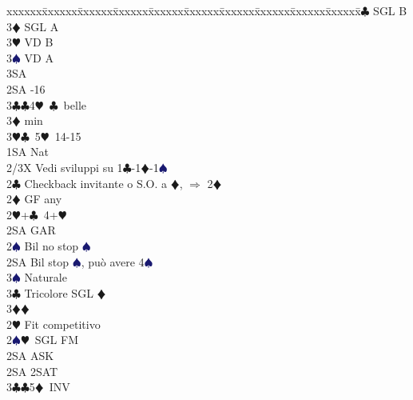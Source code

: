 \documentclass[a4paper,italian]{article}
\newcommand{\BC}{\textcolor{OliveGreen}{$\clubsuit$}}
\newcommand{\BD}{\textcolor{RedOrange}{$\vardiamondsuit$}}
\newcommand{\BH}{\textcolor{Red2}{$\varheartsuit${}}}
\newcommand{\BS}{\textcolor{MidnightBlue}{$\spadesuit${}}}
\newenvironment{bidtable}
{\begin{tabbing}

    xxxxxx\=xxxxxx\=xxxxxx\=xxxxxx\=xxxxxx\=xxxxxx\=xxxxxx\=xxxxxx\=xxxxxx\=xxxxxx\=\kill}
{\end{tabbing} }%
\begin{document}
\begin{multicols}{2}
\begin{bidtable}
                                        3\BC {} SGL B\\
                                        3\BD {} SGL A\\
                                        3\BH {} VD B\\
                                        3\BS {} VD A\\
                                        3SA \-\-\\
                                        2SA -16\\
                                        3\BC {}\BC 4\BH\ \BC\ belle\\
                                        3\BD {} min\\
                                        3\BH {}\BC\ 5\BH\ 14-15\-\\
                                        1SA \> Nat\+\\
                                        2/3X \> Vedi sviluppi su 1\BC -1\BD -1\BS \-\\
                                        2\BC \> Checkback invitante o S.O. a \BD , $\Rightarrow$ 2\BD \\
                                        2\BD \> GF any\+\\
                                        2\BH {}+\BC\ 4+\BH \+\\
                                        2SA \> GAR\-\\
                                        2\BS \> Bil no stop \BS \\
                                        2SA \> Bil stop \BS , può avere 4\BS \+\\
                                        3\BS \> Naturale\-\\
                                        3\BC \> Tricolore SGL \BD \\
                                        3\BD {}\BD \-\\
                                        [2pt]2\BH \> Fit competitivo\\
                                        2\BS {}\BH\ SGL FM\+\\
                                        2SA \> ASK\-\\
                                        2SA \> 2SAT\\
                                        3\BC {}\BC 5\BD\ INV\\

\end{bidtable}
\end{multicols}
\end{document}

